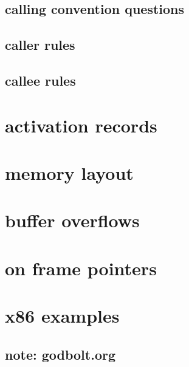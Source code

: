 

\subsection{calling convention questions}

\subsection{caller rules}



\subsection{callee rules}




\section{activation records}



\section{memory layout}



\section{buffer overflows}



\section{on frame pointers}



\section{x86 examples}

\subsection{note: godbolt.org}

